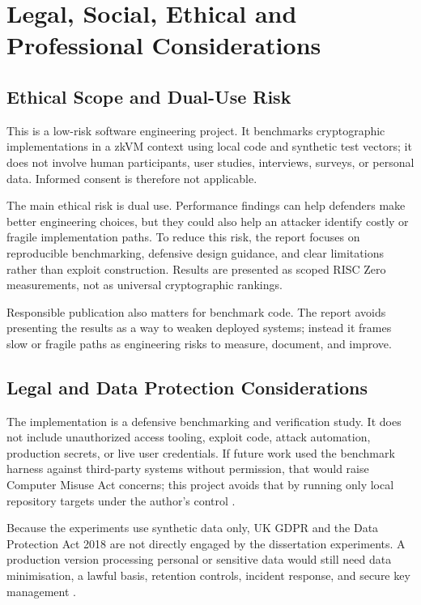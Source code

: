 \chapter{Legal, Social, Ethical and Professional Considerations}

\section{Ethical Scope and Dual-Use Risk}

This is a low-risk software engineering project. It benchmarks cryptographic
implementations in a zkVM context using local code and synthetic test vectors;
it does not involve human participants, user studies, interviews, surveys, or
personal data. Informed consent is therefore not applicable.

The main ethical risk is dual use. Performance findings can help defenders make
better engineering choices, but they could also help an attacker identify costly
or fragile implementation paths. To reduce this risk, the report focuses on
reproducible benchmarking, defensive design guidance, and clear limitations
rather than exploit construction. Results are presented as scoped RISC Zero
measurements, not as universal cryptographic rankings.

Responsible publication also matters for benchmark code. The report avoids
presenting the results as a way to weaken deployed systems; instead it frames
slow or fragile paths as engineering risks to measure, document, and improve.

\section{Legal and Data Protection Considerations}

The implementation is a defensive benchmarking and verification study. It does
not include unauthorized access tooling, exploit code, attack automation,
production secrets, or live user credentials. If future work used the benchmark
harness against third-party systems without permission, that would raise
Computer Misuse Act concerns; this project avoids that by running only local
repository targets under the author's control
\cite{computerMisuseAct1990}.

Because the experiments use synthetic data only, UK GDPR and the Data Protection
Act 2018 are not directly engaged by the dissertation experiments. A production
version processing personal or sensitive data would still need data
minimisation, a lawful basis, retention controls, incident response, and secure
key management \cite{ukgdpr2021,dataProtectionAct2018,nistsp80057p1}.

